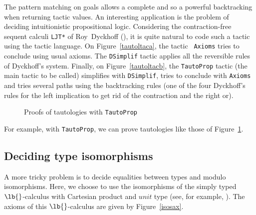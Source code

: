 The pattern matching on goals allows a complete and so a powerful
backtracking when returning tactic values. An interesting application
is the problem of deciding intuitionistic propositional logic.
Considering the contraction-free sequent calculi {\tt LJT*} of
Roy~Dyckhoff (\cite{Dyc92}), it is quite natural to code such a tactic
using the tactic language. On Figure~\ref{tautoltaca}, the tactic {\tt
  Axioms} tries to conclude using usual axioms. The {\tt DSimplif}
tactic applies all the reversible rules of Dyckhoff's system.
Finally, on Figure~\ref{tautoltacb}, the {\tt TautoProp} tactic (the
main tactic to be called) simplifies with {\tt DSimplif}, tries to
conclude with {\tt Axioms} and tries several paths using the
backtracking rules (one of the four Dyckhoff's rules for the left
implication to get rid of the contraction and the right or).

\begin{figure}[tb]
\begin{center}
\end{center}
\caption{Proofs of tautologies with {\tt TautoProp}}
\label{tautolem}
\end{figure}

For example, with {\tt TautoProp}, we can prove tautologies like those of
Figure~\ref{tautolem}.


\subsection{Deciding type isomorphisms}

A more tricky problem is to decide equalities between types and modulo
isomorphisms. Here, we choose to use the isomorphisms of the simply typed
$\lb{}$-calculus with Cartesian product and $unit$ type (see, for example,
\cite{RC95}). The axioms of this $\lb{}$-calculus are given by
Figure~\ref{isosax}.


